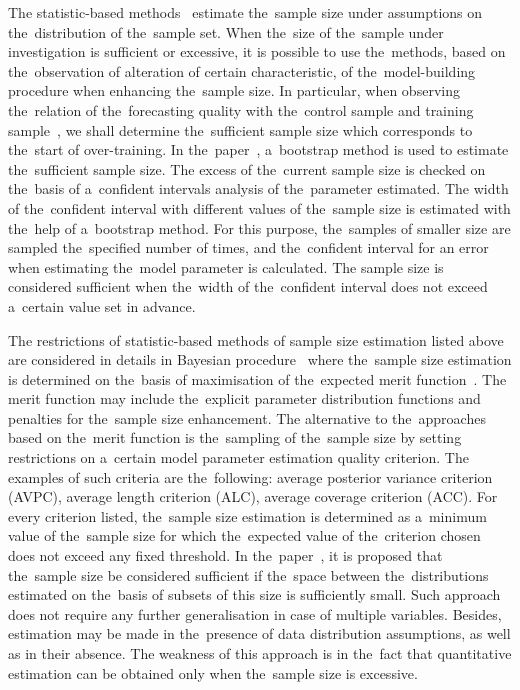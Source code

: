 \documentclass[
11pt,%
tightenlines,%
twoside,%
onecolumn,%
nofloats,%
nobibnotes,%
nofootinbib,%
superscriptaddress,%
noshowpacs,%
centertags]%
{revtex4}
\begin{document}
The statistic-based methods~\cite{motrenko2014,qumsiyeh2013} estimate the~sample size under assumptions on the~distribution of the~sample set. When the~size of the~sample under investigation is sufficient or excessive, it is possible to use the~methods, based on the~observation of alteration of certain characteristic, of the~model-building procedure when enhancing the~sample size. In particular, when observing the~relation of the~forecasting quality with the~control sample and training sample~\cite{motrenko2014}, we shall determine the~sufficient sample size which corresponds to the~start of over-training. In the~paper~\cite{qumsiyeh2013}, a~bootstrap method is used to estimate the~sufficient sample size. The excess of the~current sample size is checked on the~basis of a~confident intervals analysis of the~parameter estimated. The width of the~confident interval with different values of the~sample size is estimated with the~help of a~bootstrap method. For this purpose, the~samples of smaller size are sampled the~specified number of times, and the~confident interval for an error when estimating the~model parameter is calculated. The sample size is considered sufficient when the~width of the~confident interval does not exceed a~certain value set in advance.

The restrictions of statistic-based methods of sample size estimation listed above are considered in details in Bayesian procedure~\cite{lindley1997, rubin1998, wang2002} where the~sample size estimation is determined on the~basis of maximisation of the~expected merit function~\cite{lindley1997}. The merit function may include the~explicit parameter distribution functions and penalties for the~sample size enhancement. The alternative to the~approaches~\cite{wang2002} based on the~merit function is the~sampling of the~sample size by setting restrictions on a~certain model parameter estimation quality criterion. The examples of such criteria are the~following: average posterior variance criterion (AVPC), average length criterion (ALC), average coverage criterion (ACC). For every criterion listed, the~sample size estimation is determined as a~minimum value of the~sample size for which the~expected value of the~criterion chosen does not exceed any fixed threshold. In the~paper~\cite{motrenko2014}, it is proposed that the~sample size be considered sufficient if the~space between the~distributions estimated on the~basis of subsets of this size is sufficiently small. Such approach does not require any further generalisation in case of multiple variables. Besides, estimation may be made in the~presence of data distribution assumptions, as well as in their absence. The weakness of this approach is in the~fact that quantitative estimation can be obtained only when the~sample size is excessive. 
\end{document}
